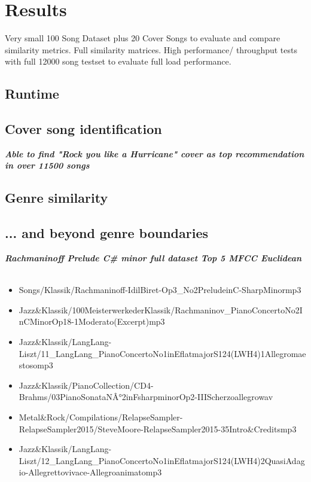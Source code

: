
\chapter{Results}\label{bds2}

Very small 100 Song Dataset plus 20 Cover Songs to evaluate and compare similarity metrics. Full similarity matrices. 
High performance/ throughput tests with full 12000 song testset to evaluate full load performance.\\

\section{Runtime}

\section{Cover song identification}

\textit{\textbf{Able to find "Rock you like a Hurricane" cover as top recommendation in over 11500 songs}}

\section{Genre similarity}

\section{... and beyond genre boundaries}

\textit{\textbf{Rachmaninoff Prelude C\# minor full dataset Top 5 MFCC Euclidean\\}}
\\
\begin{itemize}
\item Songs/Klassik/Rachmaninoff-IdilBiret-Op3\_No2PreludeinC-SharpMinormp3
\item Jazz\&Klassik/100MeisterwerkederKlassik/Rachmaninov\_PianoConcertoNo2InCMinorOp18-1Moderato(Excerpt)mp3
\item Jazz\&Klassik/LangLang-Liszt/11\_LangLang\_PianoConcertoNo1inEflatmajorS124(LWH4)1Allegromaestosomp3
\item Jazz\&Klassik/PianoCollection/CD4-Brahms/03PianoSonataNÂ°2inFsharpminorOp2-IIIScherzoallegrowav
\item Metal\&Rock/Compilations/RelapseSampler-RelapseSampler2015/SteveMoore-RelapseSampler2015-35Intro\&Creditsmp3
\item Jazz\&Klassik/LangLang-Liszt/12\_LangLang\_PianoConcertoNo1inEflatmajorS124(LWH4)2QuasiAdagio-Allegrettovivace-Allegroanimatomp3
\end{itemize}

